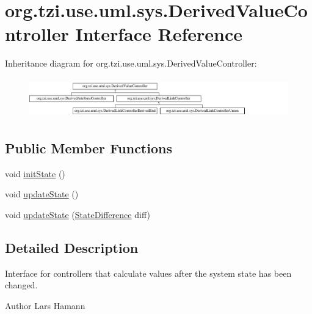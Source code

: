 \hypertarget{interfaceorg_1_1tzi_1_1use_1_1uml_1_1sys_1_1_derived_value_controller}{\section{org.\-tzi.\-use.\-uml.\-sys.\-Derived\-Value\-Controller Interface Reference}
\label{interfaceorg_1_1tzi_1_1use_1_1uml_1_1sys_1_1_derived_value_controller}
}
Inheritance diagram for org.\-tzi.\-use.\-uml.\-sys.\-Derived\-Value\-Controller\-:\begin{figure}[H]
\begin{center}
\leavevmode
\includegraphics[height=1.750000cm]{interfaceorg_1_1tzi_1_1use_1_1uml_1_1sys_1_1_derived_value_controller}
\end{center}
\end{figure}
\subsection*{Public Member Functions}
\begin{DoxyCompactItemize}
\item 
void \hyperlink{interfaceorg_1_1tzi_1_1use_1_1uml_1_1sys_1_1_derived_value_controller_a8dcff1510558677f3e46b7beb884f375}{init\-State} ()
\item 
void \hyperlink{interfaceorg_1_1tzi_1_1use_1_1uml_1_1sys_1_1_derived_value_controller_a7b713f1881420a6d9d665b362cbbe3e1}{update\-State} ()
\item 
void \hyperlink{interfaceorg_1_1tzi_1_1use_1_1uml_1_1sys_1_1_derived_value_controller_ad31fa392471971e69fb557ad3af39fb1}{update\-State} (\hyperlink{classorg_1_1tzi_1_1use_1_1util_1_1soil_1_1_state_difference}{State\-Difference} diff)
\end{DoxyCompactItemize}


\subsection{Detailed Description}
Interface for controllers that calculate values after the system state has been changed. \begin{DoxyAuthor}{Author}
Lars Hamann 
\end{DoxyAuthor}



